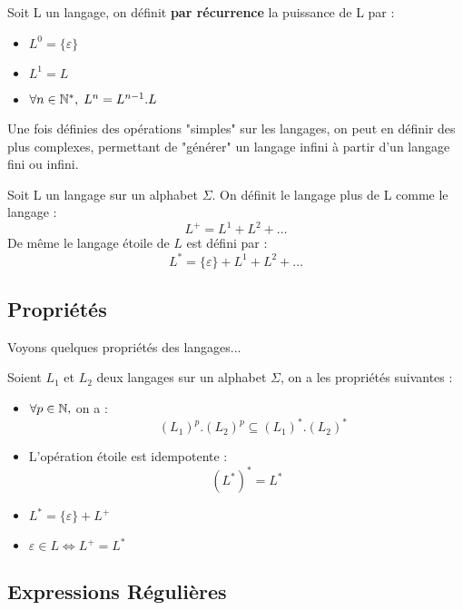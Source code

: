 \begin{definition}
    Soit L un langage, on définit \textbf{par récurrence} la puissance de L par :
    \begin{itemize}
        \item $L^0 = \{\varepsilon\}$ 
        \item $L^1 = L$
        \item $\forall n \in \mathbb{N}^*, \; L^n = L^{n-1}.L $
    \end{itemize}
\end{definition}

Une fois définies des opérations "simples" sur les langages, on peut en définir des plus complexes, permettant de "générer" un langage infini
à partir d'un langage fini ou infini. 

\begin{definition}
    Soit L un langage sur un alphabet $\Sigma$. On définit le langage plus de L comme le langage :
        \[ L^+ = L^1 + L^2 + \dots \] 
    De même le langage étoile de $L$ est défini par :
        \[ L^* = \{\varepsilon\} + L^1 + L^2 + \dots \]
\end{definition}

\subsection{Propriétés}

Voyons quelques propriétés des langages... 

\begin{proposition}
    Soient $L_1$ et $L_2$ deux langages sur un alphabet $\Sigma$, on a les propriétés suivantes :
    \begin{itemize}
        \item $ \forall p \in \mathbb{N},$ on a : 
            \[ \quad (L_1)^p . (L_2)^p \subseteq (L_1)^* . (L_2)^* \] 
        \item L'opération étoile est idempotente : 
            \[ (L^*)^* = L^* \] 
        \item $L^* = \{\varepsilon\} + L^+$ 
        \item $\varepsilon \in L \iff L^+ = L^* $ 
    \end{itemize}
\end{proposition}

\subsection{Expressions Régulières}

